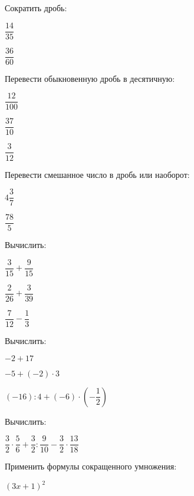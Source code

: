 \begin{listofex}
	\item Сократить дробь:
	\begin{enumcols}[itemcolumns=2]
		\item \( \dfrac{14}{35} \)
		\item \( \dfrac{36}{60} \)
	\end{enumcols}
	\item Перевести обыкновенную дробь в десятичную:
	\begin{enumcols}[itemcolumns=3]
		\item \( \dfrac{12}{100} \)
		\item \( \dfrac{37}{10} \)
		\item \( \dfrac{3}{12} \)
	\end{enumcols}
	\item Перевести смешанное число в дробь или наоборот:
	\begin{enumcols}[itemcolumns=2]
		\item \( 4\dfrac{3}{7} \)
		\item \( \dfrac{78}{5} \)
	\end{enumcols}
	\item Вычислить:
	\begin{enumcols}[itemcolumns=3]
		\item \( \dfrac{3}{15}+\dfrac{9}{15} \)
		\item \( \dfrac{2}{26}+\dfrac{3}{39} \)
		\item \( \dfrac{7}{12}-\dfrac{1}{3} \)
	\end{enumcols}
	\item Вычислить:
	\begin{enumcols}[itemcolumns=3]
		\item \( -2+17 \)
		\item \( -5+(-2)\cdot3 \)
		\item \( (-16):4+(-6)\cdot\left( -\dfrac{1}{2} \right) \)
	\end{enumcols}
	\item Вычислить:
	\begin{enumcols}[itemcolumns=3]
		\item {}
		\item \( \dfrac{3}{2}\cdot\dfrac{5}{6}+\dfrac{3}{2}:\dfrac{9}{10}-\dfrac{3}{2}\cdot\dfrac{13}{18} \)
	\end{enumcols}
	\item Применить формулы сокращенного умножения:
	\begin{enumcols}[itemcolumns=3]
		\item \( (3x+1)^2 \)

\end{enumcols}
\end{listofex}
